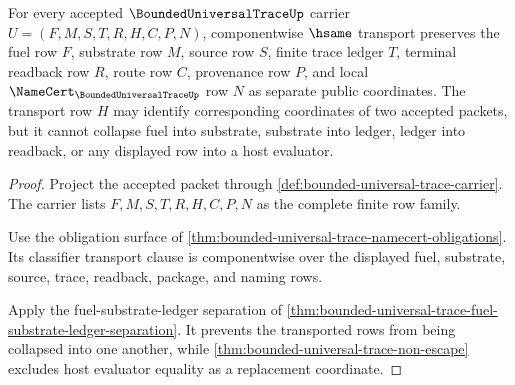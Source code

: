 \begin{theorem}
\label{thm:bounded-universal-trace-carrier-transport-obligation}
For every accepted $\BoundedUniversalTraceUp$ carrier $U=(F,M,S,T,R,H,C,P,N)$, componentwise $\hsame$ transport preserves the fuel row $F$, substrate row $M$, source row $S$, finite trace ledger $T$, terminal readback row $R$, route row $C$, provenance row $P$, and local $\NameCert_{\BoundedUniversalTraceUp}$ row $N$ as separate public coordinates. The transport row $H$ may identify corresponding coordinates of two accepted packets, but it cannot collapse fuel into substrate, substrate into ledger, ledger into readback, or any displayed row into a host evaluator.
\end{theorem}
\begin{proof}
Project the accepted packet through \autoref{def:bounded-universal-trace-carrier}. The carrier lists $F,M,S,T,R,H,C,P,N$ as the complete finite row family.

Use the obligation surface of \autoref{thm:bounded-universal-trace-namecert-obligations}. Its classifier transport clause is componentwise over the displayed fuel, substrate, source, trace, readback, package, and naming rows.

Apply the fuel-substrate-ledger separation of \autoref{thm:bounded-universal-trace-fuel-substrate-ledger-separation}. It prevents the transported rows from being collapsed into one another, while \autoref{thm:bounded-universal-trace-non-escape} excludes host evaluator equality as a replacement coordinate.
\end{proof}

